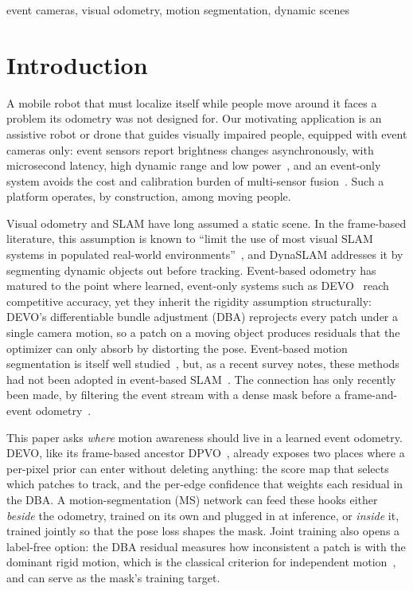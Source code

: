 \documentclass[conference]{IEEEtran}
\begin{document}
\begin{IEEEkeywords}
event cameras, visual odometry, motion segmentation, dynamic scenes
\end{IEEEkeywords}

\section{Introduction}

A mobile robot that must localize itself while people move around it faces a problem its
odometry was not designed for. Our motivating application is an assistive robot or drone
that guides visually impaired people, equipped with event cameras only: event sensors
report brightness changes asynchronously, with microsecond latency, high dynamic range and
low power~\cite{gallego2020survey}, and an event-only system avoids the cost and
calibration burden of multi-sensor fusion~\cite{klenk2024devo}. Such a platform operates,
by construction, among moving people.

Visual odometry and SLAM have long assumed a static scene. In the frame-based literature,
this assumption is known to ``limit the use of most visual SLAM systems in populated
real-world environments''~\cite{bescos2018dynaslam}, and DynaSLAM addresses it by
segmenting dynamic objects out before tracking. Event-based odometry has matured to the
point where learned, event-only systems such as DEVO~\cite{klenk2024devo} reach competitive
accuracy, yet they inherit the rigidity assumption structurally: DEVO's differentiable
bundle adjustment (DBA) reprojects every patch under a single camera motion, so a patch on
a moving object produces residuals that the optimizer can only absorb by distorting the
pose. Event-based motion segmentation is itself well
studied~\cite{mitrokhin2018tracking,stoffregen2019motionseg,zhou2021emsgc,mitrokhin2019evimo},
but, as a recent survey notes, these methods had not been adopted in event-based
SLAM~\cite{huang2023evslamsurvey}. The connection has only recently been made, by filtering
the event stream with a dense mask before a frame-and-event
odometry~\cite{pellerito2026suppression}.

This paper asks \emph{where} motion awareness should live in a learned event odometry.
DEVO, like its frame-based ancestor DPVO~\cite{teed2023dpvo}, already exposes two places
where a per-pixel prior can enter without deleting anything: the score map that selects
which patches to track, and the per-edge confidence that weights each residual in the DBA.
A motion-segmentation (MS) network can feed these hooks either \emph{beside} the odometry,
trained on its own and plugged in at inference, or \emph{inside} it, trained jointly so
that the pose loss shapes the mask. Joint training also opens a label-free option: the DBA
residual measures how inconsistent a patch is with the dominant rigid motion, which is the
classical criterion for independent motion~\cite{mitrokhin2018tracking}, and can serve as
the mask's training target.
\end{document}
